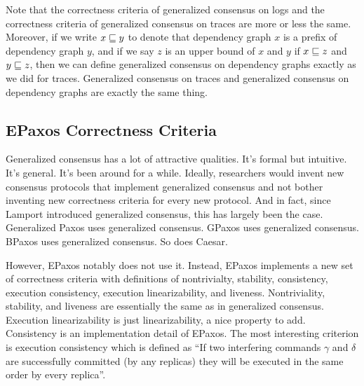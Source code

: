 Note that the correctness criteria of generalized consensus on logs and the
correctness criteria of generalized consensus on traces are more or less the
same.
%
Moreover, if we write $x \sqsubseteq y$ to denote that dependency graph $x$ is a
prefix of dependency graph $y$, and if we say $z$ is an upper bound of $x$ and
$y$ if $x \sqsubseteq z$ and $y \sqsubseteq z$, then we can define generalized
consensus on dependency graphs exactly as we did for traces. Generalized
consensus on traces and generalized consensus on dependency graphs are exactly
the same thing.

\subsection{EPaxos Correctness Criteria}
Generalized consensus has a lot of attractive qualities. It's formal but
intuitive. It's general. It's been around for a while. Ideally, researchers
would invent new consensus protocols that implement generalized consensus and
not bother inventing new correctness criteria for every new protocol. And in
fact, since Lamport introduced generalized consensus, this has largely been the
case. Generalized Paxos uses generalized consensus. GPaxos uses generalized
consensus. BPaxos uses generalized consensus. So does Caesar.

However, EPaxos notably does not use it. Instead, EPaxos implements a new set
of correctness criteria with definitions of nontrivialty, stability,
consistency, execution consistency, execution linearizability, and liveness.
Nontriviality, stability, and liveness are essentially the same as in
generalized consensus. Execution linearizability is just linearizability, a
nice property to add. Consistency is an implementation detail of EPaxos. The
most interesting criterion is execution consistency which is defined as ``If
two interfering commands $\gamma$ and $\delta$ are successfully committed (by
any replicas) they will be executed in the same order by every replica''.


